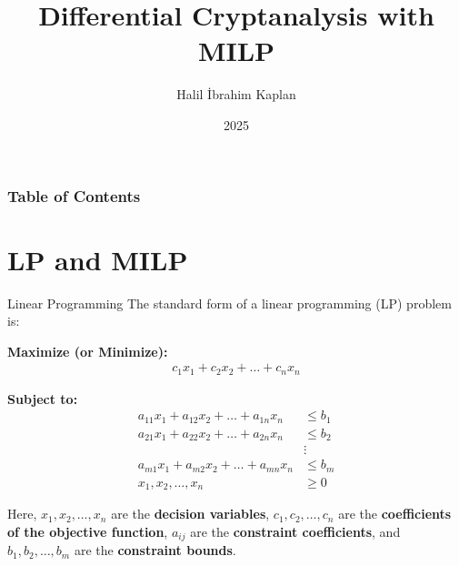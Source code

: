 \documentclass{beamer}
\title[Differential Cryptanalysis with MILP] %
{Differential Cryptanalysis with MILP}
\author[Halil İbrahim, Kaplan] %
{Halil İbrahim Kaplan }
\institute[] %
{
  Istanbul Technical University\\
  Informatics Institute
}
\date[2025] %
{2025}
\begin{document}
\frame{\titlepage}


\begin{frame}
\frametitle{Table of Contents}
\tableofcontents
\end{frame}


\section{LP and MILP}
\begin{frame}{Linear Programming}
The standard form of a linear programming (LP) problem is:

\vspace{0.5em}
\textbf{Maximize (or Minimize):}
\begin{align*}
    c_1x_1 + c_2x_2 + \dots + c_nx_n
\end{align*}

\vspace{0.5em}
\textbf{Subject to:}
\begin{align*}
    a_{11}x_1 + a_{12}x_2 + \dots + a_{1n}x_n &\leq b_1 \\
    a_{21}x_1 + a_{22}x_2 + \dots + a_{2n}x_n &\leq b_2 \\
    &\vdots \\
    a_{m1}x_1 + a_{m2}x_2 + \dots + a_{mn}x_n &\leq b_m \\
    x_1, x_2, \dots, x_n &\geq 0
\end{align*}

\vspace{0.5em}
\small
Here, $x_1, x_2, \dots, x_n$ are the \textbf{decision variables}, $c_1, c_2, \dots, c_n$ are the \textbf{coefficients of the objective function}, $a_{ij}$ are the \textbf{constraint coefficients}, and $b_1, b_2, \dots, b_m$ are the \textbf{constraint bounds}.
\end{frame}
\end{document}
